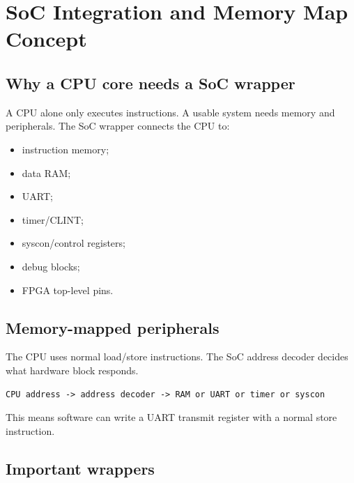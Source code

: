 \section{SoC Integration and Memory Map Concept}

\subsection{Why a CPU core needs a SoC wrapper}

A CPU alone only executes instructions. A usable system needs memory and peripherals. The SoC wrapper connects the CPU to:

\begin{itemize}
\item instruction memory;
\item data RAM;
\item UART;
\item timer/CLINT;
\item syscon/control registers;
\item debug blocks;
\item FPGA top-level pins.
\end{itemize}
\subsection{Memory-mapped peripherals}

The CPU uses normal load/store instructions. The SoC address decoder decides what hardware block responds.

\begin{lstlisting}[language={}]
CPU address -> address decoder -> RAM or UART or timer or syscon
\end{lstlisting}

This means software can write a UART transmit register with a normal store instruction.

\subsection{Important wrappers}

